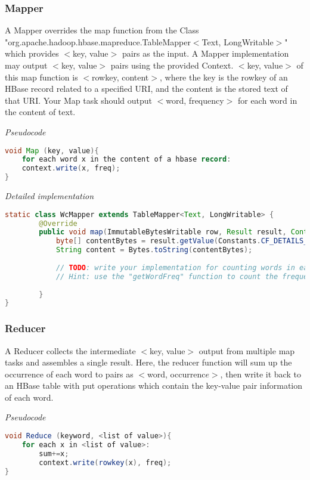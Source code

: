  
\subsubsection*{Mapper}
A Mapper overrides the map function from the Class
"org.apache.hadoop.hbase.mapreduce.TableMapper$<$Text, LongWritable$>$" which
provides $<$key, value$>$ pairs as the input. A Mapper implementation may
output $<$key, value$>$ pairs using the provided Context.  $<$key, value$>$ of
this map function is $<$rowkey, content$>$, where the key is the rowkey of an
HBase record related to a specified URI, and the content is the stored text of
that URI. Your Map task should output $<$word, frequency$>$ for each word in
the content of text.

\textit{Pseudocode}
\begin{lstlisting}[language=java] 
void Map (key, value){
    for each word x in the content of a hbase record:
    context.write(x, freq);
}
\end{lstlisting}
 
\textit{Detailed implementation}
\begin{lstlisting}[language=java] 
static class WcMapper extends TableMapper<Text, LongWritable> {
		@Override
		public void map(ImmutableBytesWritable row, Result result, Context context) throws IOException, InterruptedException {
			byte[] contentBytes = result.getValue(Constants.CF_DETAILS_BYTES, Constants.QUAL_CONTENT_BYTES);
			String content = Bytes.toString(contentBytes);
			
			// TODO: write your implementation for counting words in each row, and generating a <word, count> pair
			// Hint: use the "getWordFreq" function to count the frequencies of words in content
 
		}
}
\end{lstlisting}

\subsubsection*{Reducer}
A Reducer collects the intermediate $<$key, value$>$ output from multiple map
tasks and assembles a single result. Here, the reducer function will sum up the
occurrence of each word to pairs as $<$word, occurrenc$e>$, then write it back
to an HBase table with put operations which contain the key-value pair
information of each word.

\textit{Pseudocode}
\begin{lstlisting}[language=java] 
void Reduce (keyword, <list of value>){
    for each x in <list of value>:
        sum+=x;
        context.write(rowkey(x), freq);
}
\end{lstlisting}

